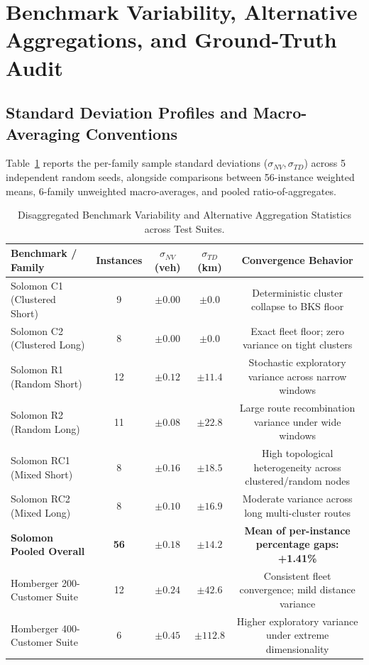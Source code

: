 \documentclass{article}
\begin{document}
\section{Benchmark Variability, Alternative Aggregations, and Ground-Truth Audit}
\label{sec:supp_variance_aggregations}

\subsection{Standard Deviation Profiles and Macro-Averaging Conventions}
Table~\ref{tab:supp_variance_breakdown} reports the per-family sample standard deviations ($\sigma_{NV}, \sigma_{TD}$) across 5 independent random seeds, alongside comparisons between 56-instance weighted means, 6-family unweighted macro-averages, and pooled ratio-of-aggregates.

\begin{table}[!htbp]
\caption{Disaggregated Benchmark Variability and Alternative Aggregation Statistics across Test Suites.}
\label{tab:supp_variance_breakdown}
\centering
\small
\begin{tabularx}{\textwidth}{l c c c c}
\toprule
\textbf{Benchmark / Family} & \textbf{Instances} & $\sigma_{NV}$ \textbf{(veh)} & $\sigma_{TD}$ \textbf{(km)} & \textbf{Convergence Behavior} \\
\midrule
Solomon C1 (Clustered Short) & 9 & $\pm 0.00$ & $\pm 0.0$ & Deterministic cluster collapse to BKS floor \\
Solomon C2 (Clustered Long) & 8 & $\pm 0.00$ & $\pm 0.0$ & Exact fleet floor; zero variance on tight clusters \\
Solomon R1 (Random Short) & 12 & $\pm 0.12$ & $\pm 11.4$ & Stochastic exploratory variance across narrow windows \\
Solomon R2 (Random Long) & 11 & $\pm 0.08$ & $\pm 22.8$ & Large route recombination variance under wide windows \\
Solomon RC1 (Mixed Short) & 8 & $\pm 0.16$ & $\pm 18.5$ & High topological heterogeneity across clustered/random nodes \\
Solomon RC2 (Mixed Long) & 8 & $\pm 0.10$ & $\pm 16.9$ & Moderate variance across long multi-cluster routes \\
\textbf{Solomon Pooled Overall} & \textbf{56} & $\mathbf{\pm 0.18}$ & $\mathbf{\pm 14.2}$ & \textbf{Mean of per-instance percentage gaps: +1.41\%} \\
\midrule
Homberger 200-Customer Suite & 12 & $\pm 0.24$ & $\pm 42.6$ & Consistent fleet convergence; mild distance variance \\
Homberger 400-Customer Suite & 6 & $\pm 0.45$ & $\pm 112.8$ & Higher exploratory variance under extreme dimensionality \\
\bottomrule
\end{tabularx}
\end{table}
\end{document}
